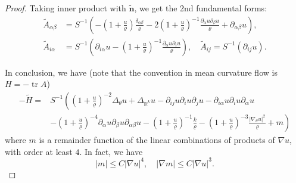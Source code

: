 \documentclass[11pt]{amsart}
\numberwithin{equation}{section}
\numberwithin{equation}{section}
\newcommand{\bn}{\mathbf{n}}
\newcommand{\R}{\mathbb{R}}
\newcommand{\pr}{\partial}
\DeclareMathOperator{\tr}{tr}
\begin{document}
\begin{proof}
		Taking inner product with $\widetilde{\bn}$, we get the 2nd fundamental forms:
		\begin{equation*}
			\begin{aligned}
				\tilde{A}_{\alpha\beta}
				&=
				S^{-1}\left(
				-(1+\frac{u}{\varrho})\frac{\delta_{\alpha\beta}}{\varrho}
				-2(1+\frac{u}{\varrho})^{-1}\frac{\pr_\alpha u \pr_{\beta}u}{\varrho}
				+\pr_{\alpha\beta} u
				\right)	,\\
				\tilde{A}_{i\alpha}
				&=
				S^{-1}\left(
				\pr_{i\alpha} u 
				-
				(1+\frac{u}{\varrho})^{-1}\frac{\pr_{\alpha}u \pr_i u}{\varrho}
				\right)	,
				\quad 		\widetilde{A}_{ij}
				=
				S^{-1}\left(\pr_{ij}u
				\right)	.
			\end{aligned}	
		\end{equation*}
		
		In conclusion, we have (note that the convention in mean curvature flow is $H=-\tr A$)
		\begin{equation}\label{eq:H}
			\begin{split}
				-\widetilde{H}
				=&
				S^{-1}
				\left(
				(1+\frac{u}{\varrho})^{-2}\Delta_\theta u
				+\Delta_{\R^k} u
				-\pr_{ij}u\pr_i u\pr_j u
				-\pr_{i\alpha} u\pr_i u\pr_\alpha u
				\right.
				\\
				&
				\left.-(1+\frac{u}{\varrho})^{-4}\pr_\alpha u \pr_\beta u\pr_{\alpha\beta}u-(1+\frac{u}{\varrho})^{-1}\frac{k}{\varrho}
				-(1+\frac{u}{\varrho})^{-3}\frac{|\nabla_\theta u|^2}{\varrho}
				+m
				\right)
			\end{split}
		\end{equation}
		where $m$ is a remainder function of the linear combinations of products of $\nabla u$, with order at least $4$. In fact, we have
		\begin{equation}\label{Eqm1}
			|m|\leq C|\nabla u|^4,\quad  |\nabla m|\leq C|\nabla u|^3.
		\end{equation}
		

\end{proof}
\end{document}
